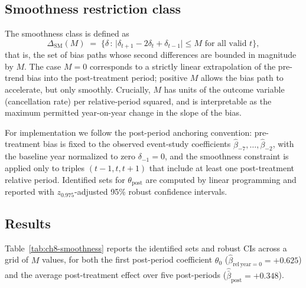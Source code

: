 \documentclass[11pt,a4paper]{article}
\begin{document}
\subsection{Smoothness restriction class}

The smoothness class is defined as
$$
\Delta_{\mathrm{SM}}(M) \;=\; \big\{\delta \,:\, \big|\delta_{t+1} - 2\delta_t + \delta_{t-1}\big| \leq M \text{ for all valid } t\big\},
$$
that is, the set of bias paths whose second differences are bounded in magnitude by $M$. The case $M=0$ corresponds to a strictly linear extrapolation of the pre-trend bias into the post-treatment period; positive $M$ allows the bias path to accelerate, but only smoothly. Crucially, $M$ has units of the outcome variable (cancellation rate) per relative-period squared, and is interpretable as the maximum permitted year-on-year change in the slope of the bias.

For implementation we follow the post-period anchoring convention: pre-treatment bias is fixed to the observed event-study coefficients $\hat{\beta}_{-7}, \ldots, \hat{\beta}_{-2}$, with the baseline year normalized to zero $\delta_{-1} = 0$, and the smoothness constraint is applied only to triples $(t-1, t, t+1)$ that include at least one post-treatment relative period. Identified sets for $\theta_{\mathrm{post}}$ are computed by linear programming and reported with $z_{0.975}$-adjusted 95\% robust confidence intervals.

\subsection{Results}

Table~\ref{tab:ch8-smoothness} reports the identified sets and robust CIs across a grid of $M$ values, for both the first post-period coefficient $\theta_{0}$ ($\hat\beta_{\mathrm{rel\,year}=0} = +0.625$) and the average post-treatment effect over five post-periods ($\hat{\bar\beta}_{\mathrm{post}} = +0.348$).
\end{document}
